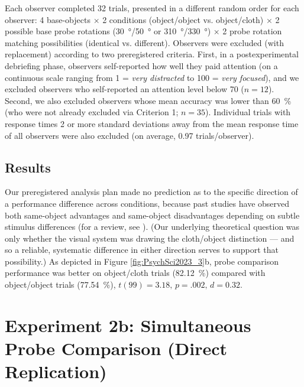 Each observer completed 32 trials, presented in a different random order for each observer: 4 base-objects $\times$ 2 conditions (object/object vs. object/cloth) $\times$ 2 possible base probe rotations (\qty{30}{\degree}/\qty{50}{\degree} or \qty{310}{\degree}/\qty{330}{\degree}) × 2 probe rotation matching possibilities (identical vs. different). Observers were excluded (with replacement) according to two preregistered criteria. First, in a postexperimental debriefing phase, observers self-reported how well they paid attention (on a continuous scale ranging from 1 = \textit{very distracted} to 100 = \textit{very focused}), and we excluded observers who self-reported an attention level below 70 ($n = 12$). Second, we also excluded observers whose mean accuracy was lower than \qty{60}{\percent} (who were not already excluded via Criterion 1; $n = 35$). Individual trials with response times 2 or more standard deviations away from the mean response time of all observers were also excluded (on average, 0.97 trials/observer).

\subsection{Results}

Our preregistered analysis plan made no prediction as to the specific direction of a performance difference across conditions, because past studies have observed both same-object advantages and same-object disadvantages depending on subtle stimulus differences (for a review, see \cite{chen_solving_2015}). (Our underlying theoretical question was only whether the visual system was drawing the cloth/object distinction --- and so a reliable, systematic difference in either direction serves to support that possibility.) As depicted in Figure \cref{fig:PsychSci2023_3}b, probe comparison performance was better on object/cloth trials (\qty{82.12}{\percent}) compared with object/object trials (\qty{77.54}{\percent}), $t(99) = 3.18,\,p = .002,\,d = 0.32$.

\section{Experiment 2b: Simultaneous Probe Comparison (Direct Replication)}

